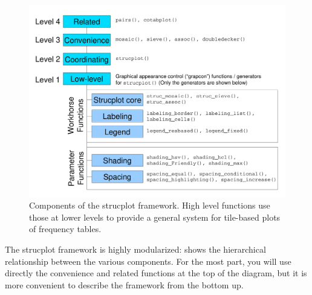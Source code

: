 \documentclass[11pt]{book}
\begin{document}
\begin{figure}
\includegraphics[width=.8\textwidth]{ch05/fig/struc}
\caption{Components of the strucplot framework. High level functions use those at lower levels to provide a general system for tile-based plots of frequency tables.}
\label{fig:struc}
\end{figure}

The strucplot framework is highly modularized: 
shows the hierarchical relationship between the various components.
For the most part, you will use directly the convenience and related
functions at the top of the diagram, but it is more convenient to 
describe the framework from the bottom up.
\end{document}
